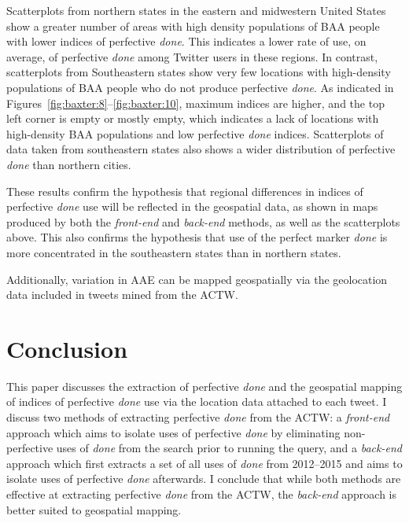 \documentclass[output=paper,draftmode,colorlinks,citecolor=brown]{langscibook}
\begin{document}
Scatterplots from northern states in the eastern and midwestern United States show a greater number of areas with high density populations of BAA people with lower indices of perfective \textit{done}. This indicates a lower rate of use, on average, of perfective \textit{done} among Twitter users in these regions. In contrast, scatterplots from Southeastern states show very few locations with high-density populations of BAA people who do not produce perfective \textit{done}. As indicated in Figures~\ref{fig:baxter:8}--\ref{fig:baxter:10}, maximum indices are higher, and the top left corner is empty or mostly empty, which indicates a lack of locations with high-density BAA populations and low perfective \textit{done} indices. Scatterplots of data taken from southeastern states also shows a wider distribution of perfective \textit{done} than northern cities.

These results confirm the hypothesis that regional differences in indices of perfective \textit{done} use will be reflected in the geospatial data, as shown in maps produced by both the \textit{front-end} and \textit{back-end} methods, as well as the scatterplots above. This also confirms the hypothesis that use of the perfect marker \textit{done} is more concentrated in the southeastern states than in northern states.

Additionally, variation in AAE can be mapped geospatially via the geolocation data included in tweets mined from the ACTW.

\section{Conclusion} %
\label{sec:baxter:6}
This paper discusses the extraction of perfective \textit{done} and the geospatial mapping of indices of perfective \textit{done} use via the location data attached to each tweet. I discuss two methods of extracting perfective \textit{done} from the ACTW: a \textit{front-end} approach which aims to isolate uses of perfective \textit{done} by eliminating non-perfective uses of \textit{done} from the search prior to running the query, and a \textit{back-end} approach which first extracts a set of all uses of \textit{done} from 2012--2015 and aims to isolate uses of perfective \textit{done} afterwards. I conclude that while both methods are effective at extracting perfective \textit{done} from the ACTW, the \textit{back-end} approach is better suited to geospatial mapping.
\end{document}
